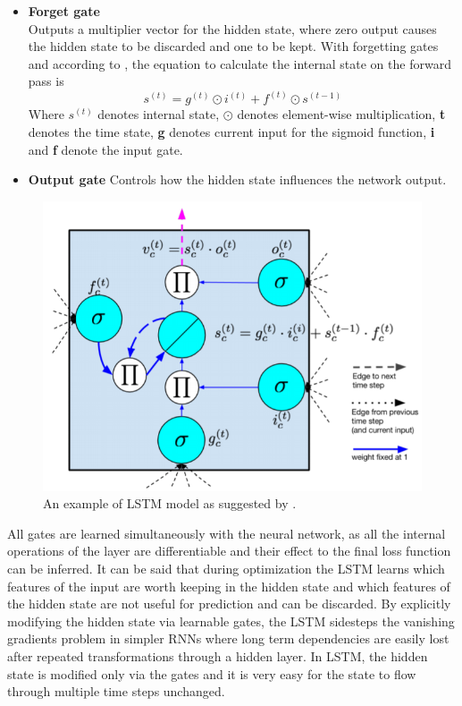\begin{itemize}
\item \textbf{Forget gate}\\
Outputs a multiplier vector for the hidden state, where zero output causes the hidden state to be discarded and one to be kept. With forgetting gates and according to \cite{gers1999learning}, the equation to calculate the internal state
on the forward pass is 
\begin{equation}
     s^{(t)}=g^{(t)}\odot i^{(t)}+f^{(t)}\odot s^{(t-1)}
\end{equation}
Where $s^{(t)}$ denotes internal state, $\odot$ denotes element-wise multiplication, \textbf{t} denotes the time state, \textbf{g} denotes current input for the sigmoid function, \textbf{i} and \textbf{f} denote the input gate.
\item \textbf{Output gate}
Controls how the hidden state influences the network output.
\end{itemize}

\begin{figure}[ht]
\centering
\includegraphics[width=0.80\columnwidth]{Figures/lstm}
\decoRule
\caption[An example of LSTM model as suggested by \cite{gers1999learning}.]{An example of LSTM model as suggested by \cite{gers1999learning}.}
\label{fig:lstm}
\end{figure}

All gates are learned simultaneously with the neural network, as all the
internal operations of the layer are differentiable and their effect to the final
loss function can be inferred. It can be said that during optimization the
LSTM learns which features of the input are worth keeping in the hidden
state and which features of the hidden state are not useful for prediction and
can be discarded.
By explicitly modifying the hidden state via learnable gates, the LSTM
sidesteps the vanishing gradients problem in simpler RNNs where long term
dependencies are easily lost after repeated transformations through a hidden
layer. In LSTM, the hidden state is modified only via the gates and it is very
easy for the state to flow through multiple time steps unchanged.\\

